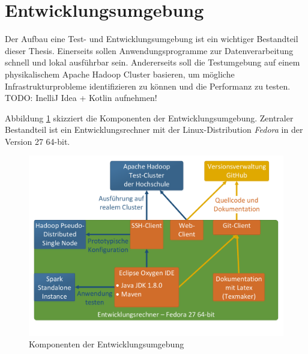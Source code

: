 \clearpage
\section{Entwicklungsumgebung}
\label{development_environment}
Der Aufbau eine Test- und Entwicklungsumgebung ist ein wichtiger Bestandteil dieser Thesis. Einerseits sollen Anwendungsprogramme zur Datenverarbeitung schnell und lokal ausführbar sein. Andererseits soll die Testumgebung auf einem physikalischem Apache Hadoop Cluster basieren, um mögliche Infrastrukturprobleme identifizieren zu können und die Performanz zu testen. \\

TODO: InelliJ Idea + Kotlin aufnehmen!

\noindent
Abbildung \ref{fig:development_environment} skizziert die Komponenten der Entwicklungsumgebung. Zentraler Bestandteil ist ein Entwicklungsrechner mit der Linux-Distribution \textit{Fedora} in der Version 27 64-bit.

\begin{figure}[ht]
  \centering
  \includegraphics[width=\textwidth]{./resource/development_environment.pdf}
  \caption{Komponenten der Entwicklungsumgebung}
  \label{fig:development_environment}
\end{figure} 

